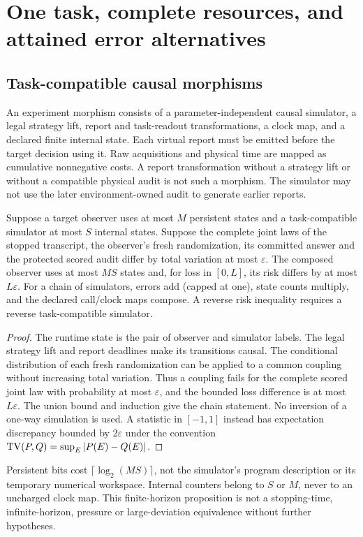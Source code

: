 \section{One task, complete resources, and attained error alternatives}\label{sec:resources}
\subsection{Task-compatible causal morphisms}
An experiment morphism consists of a parameter-independent causal simulator, a legal strategy lift, report and task-readout transformations, a clock map, and a declared finite internal state. Each virtual report must be emitted before the target decision using it. Raw acquisitions and physical time are mapped as cumulative nonnegative costs. A report transformation without a strategy lift or without a compatible physical audit is not such a morphism. The simulator may not use the later environment-owned audit to generate earlier reports.

\begin{proposition}\label{prop:composition}
Suppose a target observer uses at most $M$ persistent states and a task-compatible simulator at most $S$ internal states. Suppose the complete joint laws of the stopped transcript, the observer's fresh randomization, its committed answer and the protected scored audit differ by total variation at most $\varepsilon$. The composed observer uses at most $MS$ states and, for loss in $[0,L]$, its risk differs by at most $L\varepsilon$. For a chain of simulators, errors add (capped at one), state counts multiply, and the declared call/clock maps compose. A reverse risk inequality requires a reverse task-compatible simulator.
\end{proposition}
\begin{proof}
The runtime state is the pair of observer and simulator labels. The legal strategy lift and report deadlines make its transitions causal. The conditional distribution of each fresh randomization can be applied to a common coupling without increasing total variation. Thus a coupling fails for the complete scored joint law with probability at most $\varepsilon$, and the bounded loss difference is at most $L\varepsilon$. The union bound and induction give the chain statement. No inversion of a one-way simulation is used. A statistic in $[-1,1]$ instead has expectation discrepancy bounded by $2\varepsilon$ under the convention $\operatorname{TV}(P,Q)=\sup_E|P(E)-Q(E)|$.
\end{proof}
Persistent bits cost $\lceil\log_2(MS)\rceil$, not the simulator's program description or its temporary numerical workspace. Internal counters belong to $S$ or $M$, never to an uncharged clock map. This finite-horizon proposition is not a stopping-time, infinite-horizon, pressure or large-deviation equivalence without further hypotheses.

